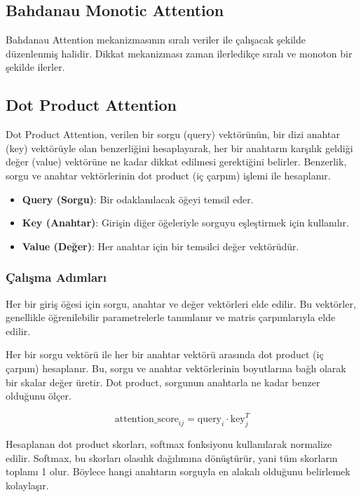 \newpage

\subsection{Bahdanau Monotic Attention}
Bahdanau Attention mekanizmasının sıralı veriler ile çalışacak şekilde düzenlenmiş halidir. Dikkat mekanizması zaman ilerledikçe sıralı ve monoton bir şekilde ilerler.

\newpage

\subsection{Dot Product Attention}

Dot Product Attention, verilen bir sorgu (query) vektörünün, bir dizi anahtar (key) vektörüyle olan benzerliğini hesaplayarak, her bir anahtarın karşılık geldiği değer (value) vektörüne ne kadar dikkat edilmesi gerektiğini belirler. Benzerlik, sorgu ve anahtar vektörlerinin dot product (iç çarpım) işlemi ile hesaplanır.

\begin{itemize}
    \item \textbf{Query (Sorgu)}: Bir odaklanılacak öğeyi temsil eder.
    \item \textbf{Key (Anahtar)}: Girişin diğer öğeleriyle sorguyu eşleştirmek için kullanılır.
    \item \textbf{Value (Değer)}: Her anahtar için bir temsilci değer vektörüdür.
\end{itemize}

\subsubsection{Çalışma Adımları}

Her bir giriş öğesi için sorgu, anahtar ve değer vektörleri elde edilir. Bu vektörler, genellikle öğrenilebilir parametrelerle tanımlanır ve matris çarpımlarıyla elde edilir.

Her bir sorgu vektörü ile her bir anahtar vektörü arasında dot product (iç çarpım) hesaplanır. Bu, sorgu ve anahtar vektörlerinin boyutlarına bağlı olarak bir skalar değer üretir. Dot product, sorgunun anahtarla ne kadar benzer olduğunu ölçer.

\[ \text{attention\_score}_{ij} = \text{query}_i \cdot \text{key}_{j}^{T} \]

Hesaplanan dot product skorları, softmax fonksiyonu kullanılarak normalize edilir. Softmax, bu skorları olasılık dağılımına dönüştürür, yani tüm skorların toplamı 1 olur. Böylece hangi anahtarın sorguyla en alakalı olduğunu belirlemek kolaylaşır.

